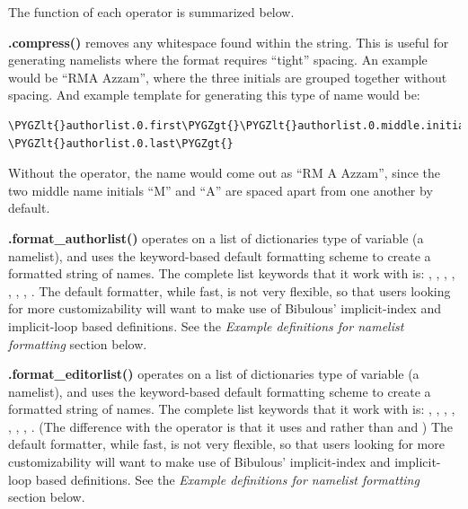 \documentclass[letterpaper,10pt,english]{sphinxmanual}
\def\PYGZlt{\char`\<}
\def\PYGZgt{\char`\>}
\begin{document}
The function of each operator is summarized below.

\textbf{.compress()} removes any whitespace found within the string. This is useful for generating namelists where the format requires ``tight'' spacing. An example would be ``RMA Azzam'', where the three initials are grouped together without spacing. And example template for generating this type of name would be:

\begin{Verbatim}[commandchars=\\\{\}]
\PYGZlt{}authorlist.0.first\PYGZgt{}\PYGZlt{}authorlist.0.middle.initial().compress()\PYGZgt{} \PYGZlt{}authorlist.0.last\PYGZgt{}
\end{Verbatim}

Without the  operator, the name would come out as ``RM A Azzam'', since the two middle name initials ``M'' and ``A'' are spaced apart from one another by default.

\textbf{.format\_authorlist()} operates on a list of dictionaries type of variable (a namelist), and uses the keyword-based default formatting scheme to create a formatted string of names. The complete list keywords that it work with is: , , , , , , , . The default formatter, while fast, is not very flexible, so that users looking for more customizability will want to make use of Bibulous' implicit-index and implicit-loop based definitions. See the \emph{Example definitions for namelist formatting} section below.

\textbf{.format\_editorlist()} operates on a list of dictionaries type of variable (a namelist), and uses the keyword-based default formatting scheme to create a formatted string of names.  The complete list keywords that it work with is: , , , , , , , . (The difference with the  operator is that it uses  and  rather than  and ) The default formatter, while fast, is not very flexible, so that users looking for more customizability will want to make use of Bibulous' implicit-index and implicit-loop based definitions. See the \emph{Example definitions for namelist formatting} section below.
\end{document}

